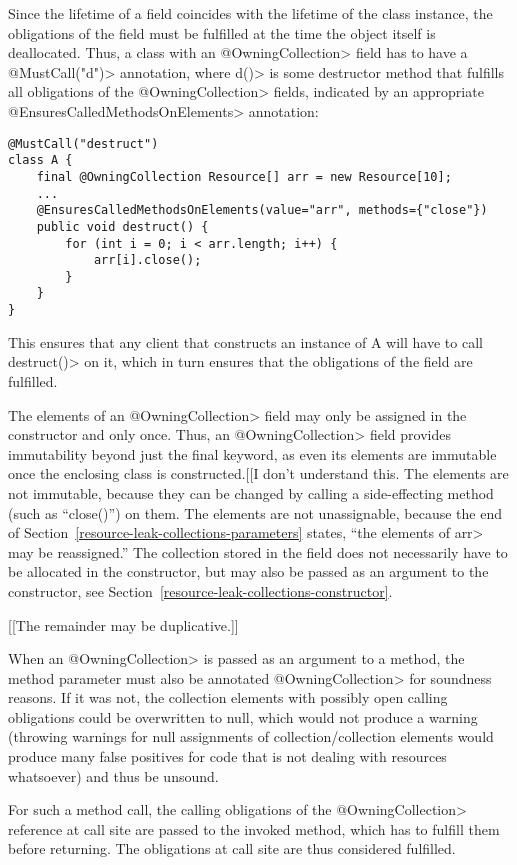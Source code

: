 Since the lifetime of a field coincides with the lifetime of the class instance, the obligations of the field must be fulfilled at the time the object itself is deallocated.
Thus, a class with an \<@OwningCollection> field has to have a \<@MustCall("d")> annotation, where \<d()> is some destructor method that fulfills all obligations of the \<@OwningCollection> fields, indicated by an appropriate \<@EnsuresCalledMethodsOnElements> annotation:

\begin{verbatim}
@MustCall("destruct")
class A {
    final @OwningCollection Resource[] arr = new Resource[10];
    ...
    @EnsuresCalledMethodsOnElements(value="arr", methods={"close"})
    public void destruct() {
        for (int i = 0; i < arr.length; i++) {
            arr[i].close();
        }
    }
}
\end{verbatim}

This ensures that any client that constructs an instance of A will have to call \<destruct()> on it, which in turn ensures that the obligations of the field are fulfilled.

The elements of an \<@OwningCollection> field may only be assigned in the
constructor and only once. Thus, an \<@OwningCollection> field provides
immutability beyond just the final keyword, as even its elements are immutable
once the enclosing class is constructed.[[I don't understand this.  The elements
are not immutable, because they can be changed by calling a side-effecting
method (such as ``close()'') on them.  The elements are not unassignable,
because the end of Section~\ref{resource-leak-collections-parameters} states,
``the elements of \<arr> may be reassigned.''  The collection stored in the
field does not necessarily have to be allocated in the constructor, but may also
be passed as an argument to the constructor, see
Section~\ref{resource-leak-collections-constructor}.


[[The remainder may be duplicative.]]

When an \<@OwningCollection> is passed as an argument to a method, the method parameter must also be annotated \<@OwningCollection> for soundness reasons. If it was not, the collection elements with possibly open calling obligations could be overwritten to null, which would not produce a warning (throwing warnings for null assignments of collection/collection elements would produce many false positives for code that is not dealing with resources whatsoever) and thus be unsound.

For such a method call, the calling obligations of the \<@OwningCollection>
reference at call site are passed to the invoked method, which has to
fulfill them before returning. The obligations at call site are thus
considered fulfilled.


